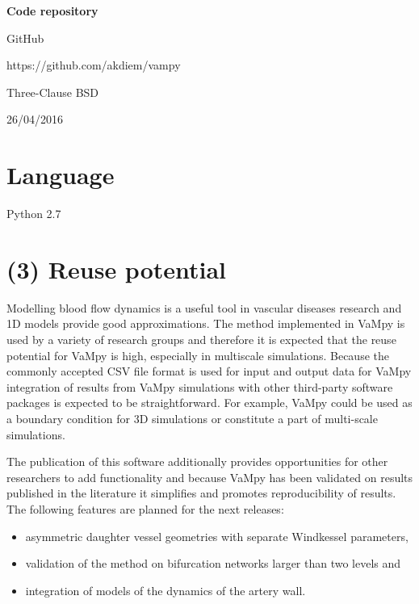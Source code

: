 \documentclass{jors}
\begin{document}
{\bf Code repository}

\begin{description}[noitemsep,topsep=0pt]
	\item[Name:] GitHub
	\item[Persistent identifier:] https://github.com/akdiem/vampy
	\item[Licence:] Three-Clause BSD
	\item[Date published:] 26/04/2016
\end{description}

\section*{Language}

Python 2.7

\section*{(3) Reuse potential}

Modelling blood flow dynamics is a useful tool in vascular diseases research and 1D models provide good approximations. The method implemented in VaMpy is used by a variety of research groups \cite{Olufsen2000,Kolachalama2007,Itu2011} and therefore it is expected that the reuse potential for VaMpy is high, especially in multiscale simulations. Because the commonly accepted CSV file format is used for input and output data for VaMpy integration of results from VaMpy simulations with other third-party software packages is expected to be straightforward. For example, VaMpy could be used as a boundary condition for 3D simulations or constitute a part of multi-scale simulations.

The publication of this software additionally provides opportunities for other researchers to add functionality and because VaMpy has been validated on results published in the literature it simplifies and promotes reproducibility of results. The following features are planned for the next releases:

\begin{itemize}
\item asymmetric daughter vessel geometries with separate Windkessel parameters,
\item validation of the method on bifurcation networks larger than two levels and
\item integration of models of the dynamics of the artery wall.
\end{itemize}
\end{document}
